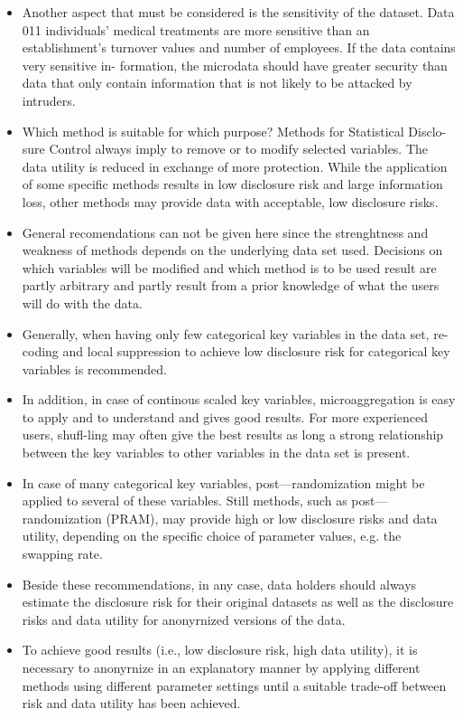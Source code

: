 \documentclass[]{article}
\begin{document}
\begin{itemize}
\item Another aspect that must be considered is the sensitivity of the dataset. Data
011 individuals’ medical treatments are more sensitive than an establishment’s
turnover values and number of employees. If the data contains very sensitive in-
formation, the microdata should have greater security than data that only contain
information that is not likely to be attacked by intruders.

\item Which method is suitable for which purpose? Methods for Statistical Disclo-
sure Control always imply to remove or to modify selected variables. The data
utility is reduced in exchange of more protection. While the application of some
speciﬁc methods results in low disclosure risk and large information loss, other
methods may provide data with acceptable, low disclosure risks. 
\item General recomendations can not be given here since the strenghtness and weakness of methods
depends on the underlying data set used. Decisions on which variables will be
modiﬁed and which method is to be used result are partly arbitrary and partly
result from a prior knowledge of what the users will do with the data.

\item Generally, when having only few categorical key variables in the data set, re-
coding and local suppression to achieve low disclosure risk for categorical key
variables is recommended. 
\item In addition, in case of continous scaled key variables,
microaggregation is easy to apply and to understand and gives good results. For
more experienced users, shufl-ling may often give the best results as long a strong
relationship between the key variables to other variables in the data set is present.

\item In case of many categorical key variables, post—randomization might be applied
to several of these variables. Still methods, such as post—randomization (PRAM),
may provide high or low disclosure risks and data utility, depending on the speciﬁc
choice of parameter values, e.g. the swapping rate.
\item Beside these recommendations, in any case, data holders should always estimate
the disclosure risk for their original datasets as well as the disclosure risks and
data utility for anonyrnized versions of the data. 
\item To achieve good results (i.e., low
disclosure risk, high data utility), it is necessary to anonyrnize in an explanatory
manner by applying different methods using different parameter settings until a
suitable trade-off between risk and data utility has been achieved.
\end{itemize}
\end{document}
